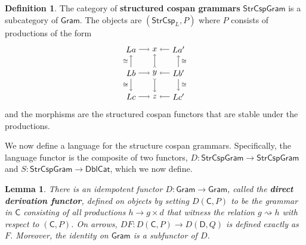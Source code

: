 \documentclass{amsart}
\newcommand{\iso}{\cong}
\newcommand{\C}{\cat{C}}
\newcommand{\D}{\cat{D}}
\newcommand{\DblCat}{\cat{DblCat}}
\newcommand{\Gram}{\cat{Gram}}
\newcommand{\StrCsp}{\cat{StrCsp}}
\newcommand{\StrCspGram}{\cat{StrCspGram}}
\newcommand{\defn}[1]{\textbf{#1}}
\newcommand{\cat}[1]{\mathsf{#1}}
\newcommand{\from}{\colon}
\newcommand{\dderiv}[2]{#1 \rightsquigarrow #2}
\newcommand{\spn}[3]{#2 \to #1 \times #3}
\newtheorem{lemma}[theorem]{Lemma}
\theoremstyle{remark}
\theoremstyle{definition}
\newtheorem{definition}[theorem]{Definition}
\begin{document}
\begin{definition} \label{def:linear-grammars}
  The category of \defn{structured cospan grammars} $ \StrCspGram $ is
  a subcategory of $ \Gram $.  The objects are $ ( \StrCsp_{L} , P ) $
  where $ P $ consists of productions of the form
  \[
    \begin{tikzpicture}
      \begin{scope}
        \node (1) at (0,2) {\( La \)};
        \node (2) at (1,2) {\( x \)};
        \node (3) at (2,2) {\( La' \)};
        \node (4) at (0,1) {\( Lb \)};
        \node (5) at (1,1) {\( y \)};
        \node (6) at (2,1) {\( Lb' \)};
        \node (7) at (0,0) {\( Lc \)};
        \node (8) at (1,0) {\( z \)};
        \node (9) at (2,0) {\( Lc' \)};
        \draw [->] (1) to node []
          {\scriptsize{\( \)}} (2);
        \draw [->] (3) to node []
          {\scriptsize{\( \)}} (2);
        \draw [->] (4) to node []
          {\scriptsize{\( \)}} (5);
        \draw [->] (6) to node []
          {\scriptsize{\( \)}} (5);
        \draw [->] (7) to node []
          {\scriptsize{\( \)}} (8);
        \draw [->] (9) to node []
          {\scriptsize{\( \)}} (8);
        \draw [->] (4) to node [left]
          {\scriptsize{\( \iso \)}} (1);
        \draw [->] (4) to node [left]
          {\scriptsize{\( \iso \)}} (7);
        \draw [>->] (5) to node []
          {\scriptsize{\( \)}} (2);
        \draw [>->] (5) to node []
          {\scriptsize{\( \)}} (8);
        \draw [->] (6) to node [right]
          {\scriptsize{\( \iso \)}} (3);
        \draw [->] (6) to node [right]
          {\scriptsize{\( \iso \)}} (9);
      \end{scope}
    \end{tikzpicture}
  \]
  and the morphisms are the structured cospan functors that are stable
  under the productions.
\end{definition}

We now define a language for the structure cospan grammars.
Specifically, the language functor is the composite of two functors,
$ D \from \StrCspGram \to \StrCspGram $ and
$ S \from \StrCspGram \to \DblCat $, which we now define.








\begin{lemma}
  There is an idempotent functor $ D \from \Gram \to \Gram $, called
  the \defn{direct derivation functor}, defined on objects by setting
  $ D ( \C , P ) $ to be the grammar in $ \C $ consisting of all
  productions $ \spn{g}{h}{d} $ that witness the relation
  $ \dderiv{g}{h} $ with respect to $ ( \C , P ) $. On arrows,
  $ DF \from D( \C , P ) \to D( \D , Q ) $ is defined exactly as
  $ F $.  Moreover, the identity on $ \Gram $ is a subfunctor of
  $ D $.
\end{lemma}
\end{document}

